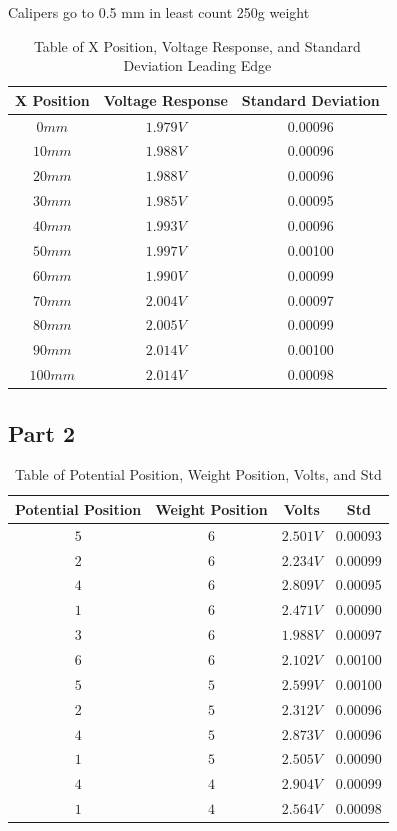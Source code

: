 \documentclass{article}
\begin{document}
Calipers go to 0.5 mm in least count
250g weight



\begin{table}[ht]
\centering
\begin{tabular}{|c|c|c|}
\hline
\textbf{X Position} & \textbf{Voltage Response} & \textbf{Standard Deviation} \\
\hline
$0 mm$ & $1.979 V$ & 0.00096\\
\hline
$10 mm$ & $1.988 V$ & 0.00096 \\
\hline
$20 mm$ & $1.988 V$ & 0.00096 \\
\hline
$30 mm$ & $1.985 V$ & 0.00095 \\
\hline
$40 mm$ & $1.993 V$ & 0.00096 \\
\hline
$50 mm$ & $1.997 V$ & 0.00100 \\
\hline
$60 mm$ & $1.990 V$ & 0.00099 \\
\hline
$70 mm$ & $2.004 V$ & 0.00097 \\
\hline
$80 mm$ & $2.005 V$ & 0.00099 \\
\hline
$90 mm$ & $2.014 V$ & 0.00100 \\
\hline
$100 mm$ & $2.014 V$ & 0.00098 \\
\hline
\end{tabular}
\caption{Table of X Position, Voltage Response, and Standard Deviation Leading Edge}
\label{tab:position_voltage_stddev2}
\end{table}

\subsection{Part 2}

\begin{table}[ht]
\centering
\begin{tabular}{|c|c|c|c|}
\hline
\textbf{Potential Position} & \textbf{Weight Position} & \textbf{Volts} & \textbf{Std} \\
\hline
$5$ & $6$ & $2.501 V$ & 0.00093 \\
\hline
$2$ & $6$ & $2.234 V$ & 0.00099 \\
\hline
$4$ & $6$ & $2.809 V$ & 0.00095 \\
\hline
$1$ & $6$ & $2.471 V$ & 0.00090 \\
\hline
$3$ & $6$ & $1.988 V$ & 0.00097 \\
\hline
$6$ & $6$ & $2.102 V$ & 0.00100 \\
\hline
$5$ & $5$ & $2.599 V$ & 0.00100 \\
\hline
$2$ & $5$ & $2.312 V$ & 0.00096 \\
\hline
$4$ & $5$ & $2.873 V$ & 0.00096 \\
\hline
$1$ & $5$ & $2.505 V$ & 0.00090 \\
\hline
$4$ & $4$ & $2.904 V$ & 0.00099 \\
\hline
$1$ & $4$ & $2.564 V$ & 0.00098 \\
\hline
\end{tabular}
\caption{Table of Potential Position, Weight Position, Volts, and Std}
\label{tab:position_weight_volts_std}
\end{table}
\end{document}

